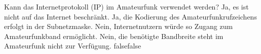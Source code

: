     {Kann das Internetprotokoll (IP) im Amateurfunk verwendet werden?}
    {Ja, es ist nicht auf das Internet beschränkt.}
    {Ja, die Kodierung des Amateurfunkrufzeichens erfolgt in der Subnetzmaske.}
    {Nein, Internetnutzern würde so Zugang zum Amateurfunkband ermöglicht.}
    {Nein, die benötigte Bandbreite steht im Amateurfunk nicht zur Verfügung.}
    {false}{false}